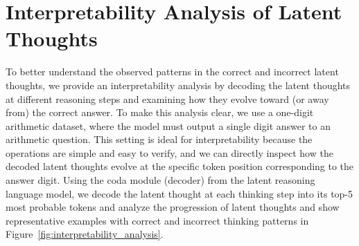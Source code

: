\documentclass{article} %
\begin{document}
\section{Interpretability Analysis of Latent Thoughts}
To better understand the observed patterns in the correct and incorrect latent thoughts, we provide an interpretability analysis by decoding the latent thoughts at different reasoning steps and examining how they evolve toward (or away from) the correct answer. To make this analysis clear, we use a one-digit arithmetic dataset, where the model must output a single digit answer to an arithmetic question. This setting is ideal for interpretability because the operations are simple and easy to verify, and we can directly inspect how the decoded latent thoughts evolve at the specific token position corresponding to the answer digit. Using the coda module (decoder) from the latent reasoning language model, we decode the latent thought at each thinking step into its top-5 most probable tokens and analyze the progression of latent thoughts and show representative examples with correct and incorrect thinking patterns in Figure~\ref{fig:interpretability_analysis}.
\end{document}
